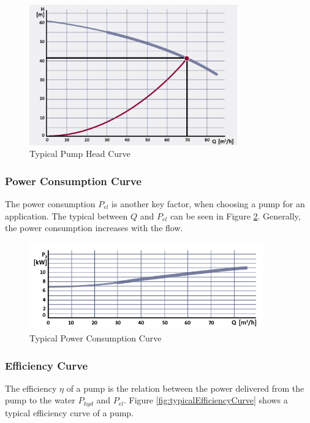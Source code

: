 \begin{figure}[h]
	\centering
	\includegraphics[width=0.8\textwidth]{figures/03physicalSetup/typicalHeadCurve.PNG}
	\caption{Typical Pump Head Curve}
	\label{fig:typicalPumpCurve}
\end{figure}

\subsubsection{Power Consumption Curve}
The power consumption $P_{el}$ is another key factor,
when choosing a pump for an application.
The typical between $Q$ and $P_{el}$ can be seen in Figure \ref{fig:typicalPowerConsumptionCurve}.
Generally, the power consumption increases with the flow.

\begin{figure}[h]
	\centering
	\includegraphics[width=0.9\textwidth]{figures/03physicalSetup/typicalPowerConsumptionCurve.PNG}
	\caption{Typical Power Consumption Curve}
	\label{fig:typicalPowerConsumptionCurve}
\end{figure}

\subsubsection{Efficiency Curve}
The efficiency $\eta$ of a pump is the relation between the power delivered from the pump to the water $P_{hyd}$ and $P_{el}$.
Figure \ref{fig:typicalEfficiencyCurve} shows 
a typical efficiency curve of a pump.

